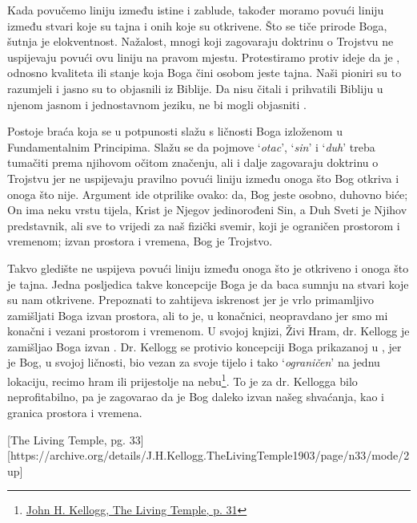 Kada povučemo liniju između istine i zablude, također moramo povući liniju između stvari koje su tajna i onih koje su otkrivene. Što se tiče prirode Boga, šutnja je elokventnost. Nažalost, mnogi koji zagovaraju doktrinu o Trojstvu ne uspijevaju povući ovu liniju na pravom mjestu. Protestiramo protiv ideje da je , odnosno kvaliteta ili stanje koja Boga čini osobom jeste tajna. Naši pioniri su to razumjeli i jasno su to objasnili iz Biblije. Da nisu čitali i prihvatili Bibliju u njenom jasnom i jednostavnom jeziku, ne bi mogli objasniti .

Postoje braća koja se u potpunosti slažu s ličnosti Boga izloženom u Fundamentalnim Principima. Slažu se da pojmove ‘\textit{otac}’, ‘\textit{sin}’ i ‘\textit{duh}’ treba tumačiti prema njihovom očitom značenju, ali i dalje zagovaraju doktrinu o Trojstvu jer ne uspijevaju pravilno povući liniju između onoga što Bog otkriva i onoga što nije. Argument ide otprilike ovako: da, Bog jeste osobno, duhovno biće; On ima neku vrstu tijela, Krist je Njegov jedinorođeni Sin, a Duh Sveti je Njihov predstavnik, ali sve to vrijedi za naš fizički svemir, koji je ograničen prostorom i vremenom; izvan prostora i vremena, Bog je Trojstvo.

Takvo gledište ne uspijeva povući liniju između onoga što je otkriveno i onoga što je tajna. Jedna posljedica takve koncepcije Boga je da baca sumnju na stvari koje su nam otkrivene. Prepoznati to zahtijeva iskrenost jer je vrlo primamljivo zamišljati Boga izvan prostora, ali to je, u konačnici, neopravdano jer smo mi konačni i vezani prostorom i vremenom. U svojoj knjizi, Živi Hram, dr. Kellogg je zamišljao Boga izvan . Dr. Kellogg se protivio koncepciji Boga prikazanoj u , jer je Bog, u svojoj ličnosti, bio vezan za svoje tijelo i tako ‘\textit{ograničen}’ na jednu lokaciju, recimo hram ili prijestolje na nebu\footnote{\href{https://archive.org/details/J.H.Kellogg.TheLivingTemple1903/page/n31/mode/2up}{John H. Kellogg, The Living Temple, p. 31}}. To je za dr. Kellogga bilo neprofitabilno, pa je zagovarao da je Bog daleko izvan našeg shvaćanja, kao i granica prostora i vremena.

[The Living Temple, pg. 33][https://archive.org/details/J.H.Kellogg.TheLivingTemple1903/page/n33/mode/2up]

